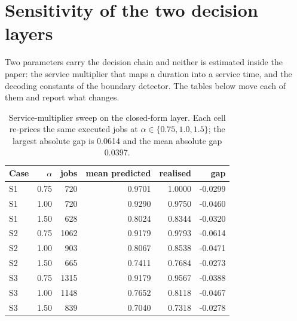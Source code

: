 \clearpage
\section{Sensitivity of the two decision layers}
\label{app:sensitivity}

Two parameters carry the decision chain and neither is estimated inside the paper: the
service multiplier that maps a duration into a service time, and the decoding constants
of the boundary detector. The tables below move each of them and report what changes.

\begin{table}[H]
\centering
\scriptsize
\begin{tabular}{@{}lrrrrr@{}}
\hline
Case & $\alpha$ & jobs & mean predicted & realised & gap \\
\hline
S1 & 0.75 & 720 & 0.9701 & 1.0000 & -0.0299 \\
S1 & 1.00 & 720 & 0.9290 & 0.9750 & -0.0460 \\
S1 & 1.50 & 628 & 0.8024 & 0.8344 & -0.0320 \\
S2 & 0.75 & 1062 & 0.9179 & 0.9793 & -0.0614 \\
S2 & 1.00 & 903 & 0.8067 & 0.8538 & -0.0471 \\
S2 & 1.50 & 665 & 0.7411 & 0.7684 & -0.0273 \\
S3 & 0.75 & 1315 & 0.9179 & 0.9567 & -0.0388 \\
S3 & 1.00 & 1148 & 0.7652 & 0.8118 & -0.0467 \\
S3 & 1.50 & 839 & 0.7040 & 0.7318 & -0.0278 \\
\hline
\end{tabular}
\caption{Service-multiplier sweep on the closed-form layer. Each cell re-prices the same
executed jobs at $\alpha\in\{0.75,1.0,1.5\}$; the largest absolute gap is
0.0614 and the mean absolute gap 0.0397.}
\label{tab:alpha-sweep}
\end{table}

